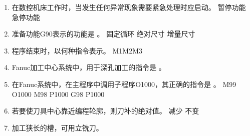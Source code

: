 \documentclass[12pt,twocolumn,landscape,UTF8,twoside]{ctexart}
\begin{document}
\begin{spacing}{1.3}
\begin{enumerate} [1、]
\item 在数控机床工作时，当发生任何异常现象需要紧急处理时应启动。
	{暂停功能}	{急停功能}
\item 准备功能G90表示的功能是	。
	{固定循环}	{绝对尺寸}	{增量尺寸}
\item 程序结束时，以何种指令表示。
	{M1}{M2}{M3}
\item Fanuc加工中心系统中，用于深孔加工的指令是		。
\item 在Fanuc系统中，在主程序中调用子程序O1000，其正确的指令是		。
		{M99 O1000}		{M98 P1000}		{G98 P1000}
\item 若要使刀具中心靠近编程轮廓，则刀补的绝对值。
	{减少}	{不变}	
\item 加工狭长的槽，可用立铣刀。


\end{enumerate}
\end{spacing}
\end{document}
